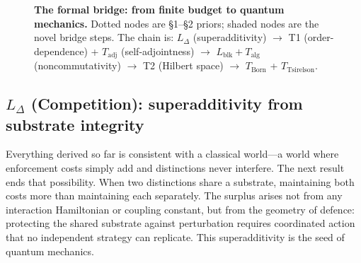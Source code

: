 \documentclass[11pt]{article}
\theoremstyle{remark}
\begin{document}
\begin{figure}[ht]
\caption[Formal bridge]{%
\textbf{The formal bridge: from finite budget to quantum mechanics.}
Dotted nodes are §1--§2 priors; shaded nodes are the novel bridge steps.
The chain is: $L_\Delta$ (superadditivity) $\to$ T1 (order-dependence) + $T_{\mathrm{adj}}$ (self-adjointness) $\to$ $L_{\mathrm{blk}} + T_{\mathrm{alg}}$ (noncommutativity) $\to$ T2 (Hilbert space) $\to$ $T_{\mathrm{Born}}$ + $T_{\mathrm{Tsirelson}}$.
}
\label{fig:formal_bridge_dag}
\end{figure}


\subsection{\texorpdfstring{$L_{\Delta}$}{L Delta} (Competition): superadditivity from substrate integrity}
\label{thm:ldelta}\label{sec:L_Delta}

Everything derived so far is consistent with a classical world---a world where enforcement costs simply add and distinctions never interfere.  The next result ends that possibility.  When two distinctions share a substrate, maintaining both costs more than maintaining each separately.  The surplus arises not from any interaction Hamiltonian or coupling constant, but from the geometry of defence: protecting the shared substrate against perturbation requires coordinated action that no independent strategy can replicate.  This superadditivity is the seed of quantum mechanics.
\end{document}
